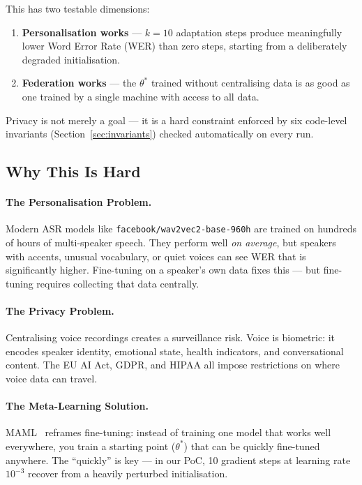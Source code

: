 \documentclass[11pt,a4paper]{article}
\theoremstyle{definition}
\begin{document}
This has two testable dimensions:

\begin{enumerate}[leftmargin=*]
  \item \textbf{Personalisation works} --- $k=10$ adaptation steps produce
        meaningfully lower Word Error Rate (WER) than zero steps, starting from a
        deliberately degraded initialisation.
  \item \textbf{Federation works} --- the $\theta^*$ trained without centralising
        data is as good as one trained by a single machine with access to all data.
\end{enumerate}

Privacy is not merely a goal --- it is a hard constraint enforced by six
code-level invariants (Section~\ref{sec:invariants}) checked automatically on
every run.

\subsection{Why This Is Hard}

\paragraph{The Personalisation Problem.}
Modern ASR models like \texttt{facebook/wav2vec2-base-960h} are trained on
hundreds of hours of multi-speaker speech.  They perform well \emph{on average},
but speakers with accents, unusual vocabulary, or quiet voices can see WER that is
significantly higher.  Fine-tuning on a speaker's own data fixes this --- but
fine-tuning requires collecting that data centrally.

\paragraph{The Privacy Problem.}
Centralising voice recordings creates a surveillance risk.  Voice is biometric: it
encodes speaker identity, emotional state, health indicators, and conversational
content.  The EU AI Act, GDPR, and HIPAA all impose restrictions on where voice
data can travel.

\paragraph{The Meta-Learning Solution.}
MAML~\cite{finn2017maml} reframes fine-tuning: instead of training one model that
works well everywhere, you train a starting point ($\theta^*$) that can be quickly
fine-tuned anywhere.  The ``quickly'' is key --- in our PoC, 10 gradient steps at
learning rate $10^{-3}$ recover from a heavily perturbed initialisation.
\end{document}

